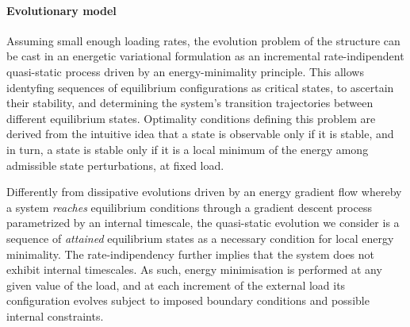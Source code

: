 \documentclass[10pt]{article}
\begin{document}
%


%


%
%
%
%



%
%
%

%

%

%





\paragraph{Evolutionary model}
\label{sec:stability}

Assuming small enough loading rates, 
the evolution problem of the structure can be cast in an energetic variational formulation as an incremental rate-indipendent quasi-static process driven by an energy-minimality principle.
This allows identyfing sequences of equilibrium configurations as critical states, to ascertain their stability, and determining the system's transition trajectories between different equilibrium states.
Optimality conditions defining this problem are derived from the
intuitive idea that a state is observable only if it is stable, and in turn, a state is stable only if it is a local minimum of the energy among admissible state perturbations, at fixed load. 

Differently from dissipative evolutions driven by an energy gradient flow whereby a system \emph{reaches} equilibrium conditions through a gradient descent process parametrized by an internal timescale, the quasi-static evolution we consider is a sequence of \emph{attained} equilibrium states as a necessary condition for local energy minimality. 
The rate-indipendency further implies that the system does not exhibit internal timescales.
As such, energy minimisation is performed at any given value of the load, and at each increment of the external load its configuration evolves subject to imposed boundary conditions and possible internal constraints.
%
%
%
\end{document}
